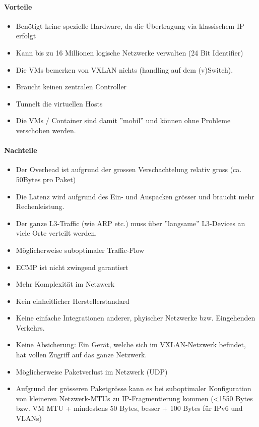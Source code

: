 \paragraph{Vorteile}
\begin{itemize}
	\item Benötigt keine spezielle Hardware, da die Übertragung via klassischem IP erfolgt
	\item Kann bis zu 16 Millionen logische Netzwerke verwalten (24 Bit Identifier)
	\item Die VMs bemerken von VXLAN nichts (handling auf dem (v)Switch).
	\item Braucht keinen zentralen Controller
	\item Tunnelt die virtuellen Hosts
	\item Die VMs / Container sind damit ''mobil'' und können ohne Probleme verschoben werden.
\end{itemize}

\paragraph{Nachteile}
\begin{itemize}
	\item Der Overhead ist aufgrund der grossen Verschachtelung relativ gross (ca. 50Bytes pro Paket)
	\item Die Latenz wird aufgrund des Ein- und Auspacken grösser und braucht mehr Rechenleistung.
	\item Der ganze L3-Traffic (wie ARP etc.) muss über ''langsame'' L3-Devices an viele Orte verteilt werden.
	\item Möglicherweise suboptimaler Traffic-Flow
	\item ECMP ist nicht zwingend garantiert
	\item Mehr Komplexität im Netzwerk
	\item Kein einheitlicher Herstellerstandard
	\item Keine einfache Integrationen anderer, phyischer Netzwerke bzw. Eingehenden Verkehrs.
	\item Keine Absicherung: Ein Gerät, welche sich im VXLAN-Netzwerk befindet, hat vollen Zugriff auf das ganze Netzwerk.
	\item Möglicherweise Paketverlust im Netzwerk (UDP)
	\item Aufgrund der grösseren Paketgrösse kann es bei suboptimaler Konfiguration von kleineren Netzwerk-MTUs zu IP-Fragmentierung kommen (<1550 Bytes bzw. VM MTU + mindestens 50 Bytes, besser + 100 Bytes für IPv6 und VLANs)
\end{itemize}

